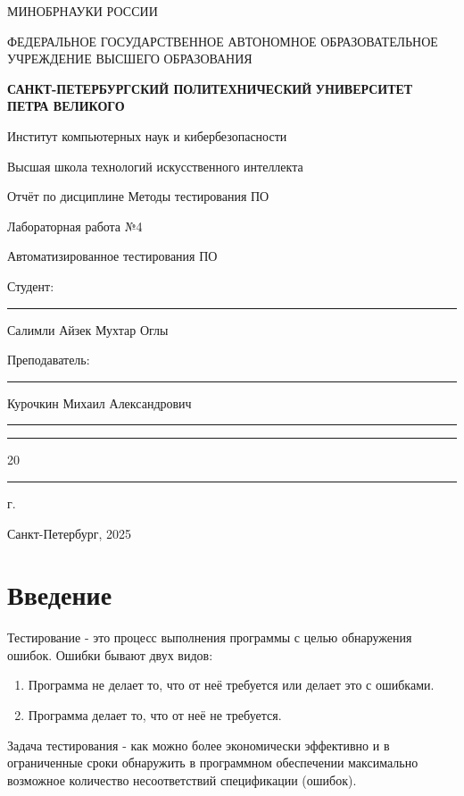 \documentclass[areasetadvanced]{scrartcl}
\begin{document}
\sloppy
	\thispagestyle{empty}
	\begin{center}
		\large{МИНОБРНАУКИ РОССИИ} \par
		\vspace{0.3cm}
		\normalsize
		{ФЕДЕРАЛЬНОЕ ГОСУДАРСТВЕННОЕ АВТОНОМНОЕ ОБРАЗОВАТЕЛЬНОЕ УЧРЕЖДЕНИЕ ВЫСШЕГО ОБРАЗОВАНИЯ} \par
		\vspace{0.3cm}
		\textbf{\guillemotleft САНКТ-ПЕТЕРБУРГСКИЙ ПОЛИТЕХНИЧЕСКИЙ}
		\textbf{УНИВЕРСИТЕТ ПЕТРА ВЕЛИКОГО\guillemotright} \par
		\vspace{0.3cm}
		{Институт компьютерных наук и кибербезопасности}\par
		{Высшая школа технологий искусственного интеллекта}\par
	\end{center}
	\vfill
	\begin{center}
		{\large Отчёт по дисциплине \guillemotleft Методы тестирования ПО \guillemotright}\par
		{\huge   Лабораторная работа №4 
		
		\guillemotleft Автоматизированное тестирования ПО\guillemotright}\par
         
	\end{center}
	\vfill
	\begin{flushleft}
		Студент: \hspace{1.8cm} \rule[0pt]{2.5cm}{0.5pt}\hfill Салимли Айзек Мухтар Оглы\par
		\vspace{1.5cm}
		Преподаватель: \hspace{0.55cm} \rule[0pt]{2.5cm}{0.5pt}\hfill  Курочкин Михаил Александрович
	\end{flushleft}
	\vspace{0.5cm}
	\begin{flushright}
		\guillemotleft \rule[0pt]{0.8cm}{0.5pt}\guillemotright \rule[0pt]{2cm}{0.5pt} 20\rule[0pt]{0.5cm}{0.5pt} г.
	\end{flushright}
	\vfill
	\begin{center}
		Санкт-Петербург, 2025
	\end{center}
	\newpage
	\tableofcontents
	\newpage
\section*{Введение}
	Тестирование - это процесс выполнения программы с целью обнаружения
	ошибок.
	Ошибки бывают двух видов:
	\begin{enumerate}
		\item Программа не делает то, что от неё требуется или делает это с ошибками.
		\item Программа делает то, что от неё не требуется.
	\end{enumerate}
	Задача тестирования - как можно более экономически эффективно и в ограниченные сроки обнаружить в программном обеспечении максимально возможное количество несоответствий спецификации (ошибок).
\end{document}
